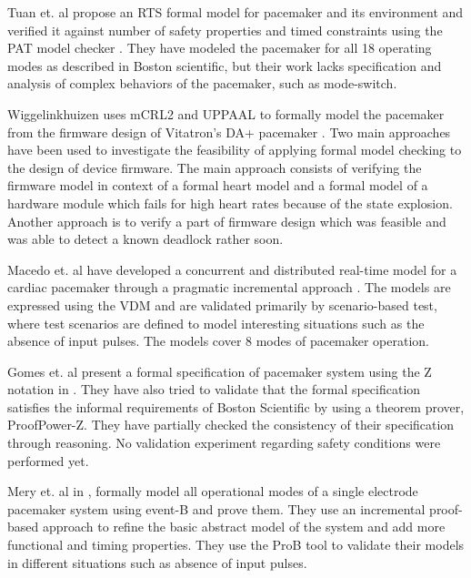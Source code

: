 Tuan et. al propose an RTS formal model for pacemaker and its environment and verified it against number of safety properties and timed constraints using the PAT model checker \cite{Tuan}. They have modeled the pacemaker for all 18 operating modes as described in Boston scientific, but their work lacks specification and analysis of complex behaviors of the pacemaker, such as mode-switch.

Wiggelinkhuizen uses mCRL2 and UPPAAL to formally model the pacemaker from the firmware design of Vitatron's DA+ pacemaker \cite{Wigg}. Two main approaches have been used to investigate the feasibility of applying formal model checking to the design of device firmware. The main approach consists of verifying the firmware model in context of a formal heart model and a formal model of a hardware module which fails for high heart rates because of the state explosion. Another approach is to verify a part of firmware design which was feasible and was able to detect a known deadlock rather soon.

Macedo et. al have developed a concurrent and distributed real-time model for a cardiac pacemaker through a pragmatic incremental approach \cite{Macedo}. The models are expressed using the VDM and are validated primarily by scenario-based test, where test scenarios are defined to model interesting situations such as the absence of input pulses. The models cover 8 modes of pacemaker operation.

Gomes et. al present a formal specification of pacemaker system using the Z notation in \cite{Gomes}. They have also tried to validate that the formal specification satisfies the informal requirements of Boston Scientific by using a theorem prover, ProofPower-Z. They have partially checked the consistency of their specification through reasoning. No validation experiment regarding safety conditions were performed yet.

Mery et. al in \cite{Mery}, formally model all operational modes of a single electrode pacemaker system using event-B and prove them. They use an incremental proof-based approach to refine the basic abstract model of the system and add more functional and timing properties. They use the ProB tool to validate their models in different situations such as absence of input pulses. \\


